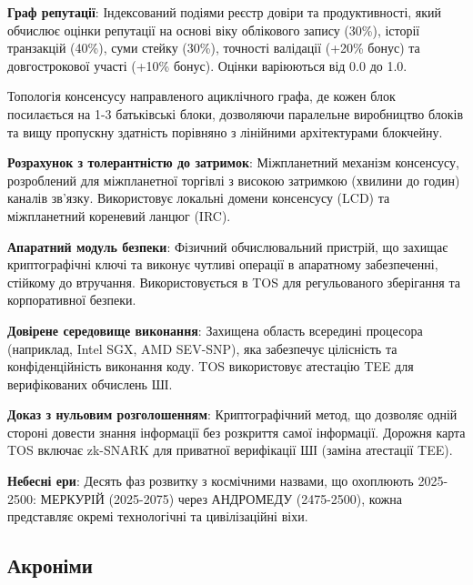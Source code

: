 \documentclass[11pt]{article}
\begin{document}
\begin{description}[leftmargin=3cm, style=nextline]
  \item[RepGraph] \textbf{Граф репутації}: Індексований подіями реєстр довіри та продуктивності, який обчислює оцінки репутації на основі віку облікового запису (30\%), історії транзакцій (40\%), суми стейку (30\%), точності валідації (+20\% бонус) та довгострокової участі (+10\% бонус). Оцінки варіюються від 0.0 до 1.0.

  \item[BlockDAG] Топологія консенсусу направленого ациклічного графа, де кожен блок посилається на 1-3 батьківські блоки, дозволяючи паралельне виробництво блоків та вищу пропускну здатність порівняно з лінійними архітектурами блокчейну.

  \item[DT-Settlement] \textbf{Розрахунок з толерантністю до затримок}: Міжпланетний механізм консенсусу, розроблений для міжпланетної торгівлі з високою затримкою (хвилини до годин) каналів зв'язку. Використовує локальні домени консенсусу (LCD) та міжпланетний кореневий ланцюг (IRC).

  \item[HSM] \textbf{Апаратний модуль безпеки}: Фізичний обчислювальний пристрій, що захищає криптографічні ключі та виконує чутливі операції в апаратному забезпеченні, стійкому до втручання. Використовується в TOS для регульованого зберігання та корпоративної безпеки.

  \item[TEE] \textbf{Довірене середовище виконання}: Захищена область всередині процесора (наприклад, Intel SGX, AMD SEV-SNP), яка забезпечує цілісність та конфіденційність виконання коду. TOS використовує атестацію TEE для верифікованих обчислень ШІ.

  \item[ZK Proof] \textbf{Доказ з нульовим розголошенням}: Криптографічний метод, що дозволяє одній стороні довести знання інформації без розкриття самої інформації. Дорожня карта TOS включає zk-SNARK для приватної верифікації ШІ (заміна атестації TEE).

  \item[Celestial Eras] \textbf{Небесні ери}: Десять фаз розвитку з космічними назвами, що охоплюють 2025-2500: МЕРКУРІЙ (2025-2075) через АНДРОМЕДУ (2475-2500), кожна представляє окремі технологічні та цивілізаційні віхи.
\end{description}

\subsection*{Акроніми}
\end{document}
